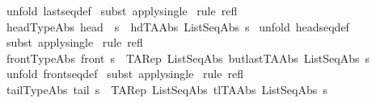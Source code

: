 \begin{isabellebody}
%
\isadelimproof
%
\endisadelimproof
%
\isatagproof
{}\isamarkupfalse%
\ {\isacharparenleft}unfold\ lastseq{\isacharunderscore}def{\isacharparenright}\isanewline
{}\isamarkupfalse%
\ {\isacharparenleft}subst\ apply{\isacharunderscore}single{\isacharparenright}\isanewline
{}\isamarkupfalse%
\ {\isacharparenleft}rule\ refl{\isacharparenright}\isanewline
{}\isamarkupfalse%
%
\endisatagproof
{\isafoldproof}%
%
\isadelimproof
\isanewline
%
\endisadelimproof
\isanewline
{}\isamarkupfalse%
\ head{\isacharunderscore}TypeAbs{\isacharcolon}\ {\isachardoublequoteopen}{\isacharparenleft}head\ \ s{\isacharparenright}\ {\isacharequal}\ {\isacharparenleft}hd{\isacharparenleft}TAAbs\ ListSeqAbs\ s{\isacharparenright}{\isacharparenright}{\isachardoublequoteclose}\isanewline
%
\isadelimproof
%
\endisadelimproof
%
\isatagproof
{}\isamarkupfalse%
\ {\isacharparenleft}unfold\ headseq{\isacharunderscore}def{\isacharparenright}\isanewline
{}\isamarkupfalse%
\ {\isacharparenleft}subst\ apply{\isacharunderscore}single{\isacharparenright}\isanewline
{}\isamarkupfalse%
\ {\isacharparenleft}rule\ refl{\isacharparenright}\isanewline
{}\isamarkupfalse%
%
\endisatagproof
{\isafoldproof}%
%
\isadelimproof
\isanewline
%
\endisadelimproof
\isanewline
{}\isamarkupfalse%
\ front{\isacharunderscore}TypeAbs{\isacharcolon}\ {\isachardoublequoteopen}{\isacharparenleft}front\ s{\isacharparenright}\ {\isacharequal}\ {\isacharparenleft}TARep\ ListSeqAbs\ {\isacharparenleft}butlast{\isacharparenleft}TAAbs\ ListSeqAbs\ s{\isacharparenright}{\isacharparenright}{\isacharparenright}{\isachardoublequoteclose}\isanewline
%
\isadelimproof
%
\endisadelimproof
%
\isatagproof
{}\isamarkupfalse%
\ {\isacharparenleft}unfold\ frontseq{\isacharunderscore}def{\isacharparenright}\isanewline
{}\isamarkupfalse%
\ {\isacharparenleft}subst\ apply{\isacharunderscore}single{\isacharparenright}\isanewline
{}\isamarkupfalse%
\ {\isacharparenleft}rule\ refl{\isacharparenright}\isanewline
{}\isamarkupfalse%
%
\endisatagproof
{\isafoldproof}%
%
\isadelimproof
\isanewline
%
\endisadelimproof
\isanewline
{}\isamarkupfalse%
\ tail{\isacharunderscore}TypeAbs{\isacharcolon}\ {\isachardoublequoteopen}{\isacharparenleft}tail\ s{\isacharparenright}\ {\isacharequal}\ {\isacharparenleft}TARep\ ListSeqAbs\ {\isacharparenleft}tl{\isacharparenleft}TAAbs\ ListSeqAbs\ s{\isacharparenright}{\isacharparenright}{\isacharparenright}{\isachardoublequoteclose}\isanewline

\end{isabellebody}
